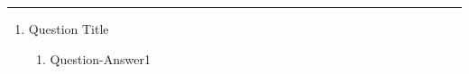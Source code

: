 \documentclass[11pt]{article}
\begin{document}
\Large




\medskip\hrule
\begin{enumerate}

\item Question Title
\begin{enumerate}
    \item Question-Answer1
\end{enumerate}

\end{enumerate}
\end{document}
